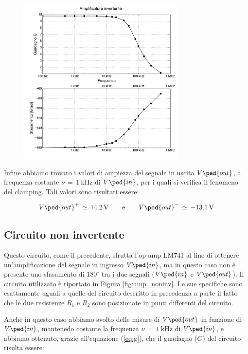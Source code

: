 \begin{figure}
    \includegraphics[width=0.75\textwidth]{amp_inv.pdf}
    \caption{}
    \label{fig:g_vs_freq}
\end{figure}

Infine abbiamo trovato i valori di ampiezza del segnale in uscita $V\ped{out}$, a frequenza costante $\nu\,=\,\SI{1}{\kilo\hertz}$ di $V\ped{in}$, per i quali si verifica il fenomeno del clamping. Tali valori sono risultati essere:

\begin{equation}
        V\ped{out}^{+}\,\simeq\,\SI{14.2}{\volt} \qquad \text{e} \qquad V\ped{out}^{-}\,\simeq\,\SI{-13.1}{\volt}
        \label{eq:clamping_1}
\end{equation}

\subsection*{Circuito non invertente}

Questo circuito, come il precedente, sfrutta l'op-amp LM741 al fine di ottenere un'amplificazione del segnale in ingresso $V\ped{in}$, ma in questo caso non è presente uno sfasamento di $180^\circ$ tra i due segnali ($V\ped{in}$ e $V\ped{out}$).
Il circuito utilizzato è riportato in Figura \ref{fig:amp_noninv}. Le sue specifiche sono esattamente uguali a quelle del circuito descritto in precedenza a parte il fatto che le due resistenze $R_1$ e $R_2$ sono posizionate in punti differenti del circuito.

Anche in questo caso abbiamo svolto delle misure di $V\ped{out}$ in funzione di $V\ped{in}$, mantenedo costante la frequenza $\nu\,=\,\SI{1}{\kilo\hertz}$ di $V\ped{in}$, e abbiamo ottenuto, grazie all'equazione (\ref{eq:g}), che il guadagno ($G$) del circuito risulta essere:

